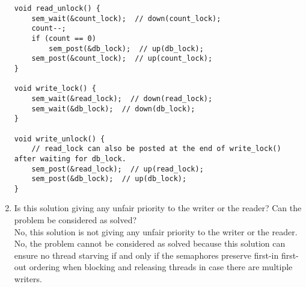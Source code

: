 \documentclass[a4paper]{article}
\begin{document}
\begin{enumerate}
\begin{verbatim}
void read_unlock() {
    sem_wait(&count_lock);  // down(count_lock);
    count--;
    if (count == 0)
        sem_post(&db_lock);  // up(db_lock);
    sem_post(&count_lock);  // up(count_lock);
}

void write_lock() {
    sem_wait(&read_lock);  // down(read_lock);
    sem_wait(&db_lock);  // down(db_lock);
}

void write_unlock() {
    // read_lock can also be posted at the end of write_lock() after waiting for db_lock.
    sem_post(&read_lock);  // up(read_lock);
    sem_post(&db_lock);  // up(db_lock);
}
    \end{verbatim}
    \item Is this solution giving any unfair priority to the writer or the reader? Can the problem be considered as solved?\\
    No, this solution is not giving any unfair priority to the writer or the reader.\\
    No, the problem cannot be considered as solved because this solution can ensure no thread starving if and only if the semaphores preserve first-in first-out ordering when blocking and releasing threads in case there are multiple writers.
\end{enumerate}
\end{document}
